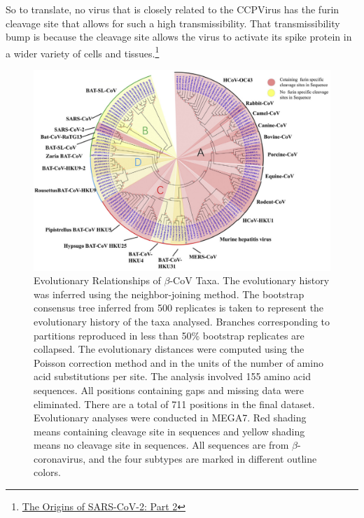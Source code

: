 \documentclass[11pt]{article}
\begin{document}
So to translate, no virus that is closely related to the CCPVirus has the furin cleavage site that allows for such a high transmissibility. That transmissibility bump is because the cleavage site allows the virus to activate its spike protein in a wider variety of cells and tissues.\footnote{\href{https://archive.is/XkCN0}{The Origins of SARS-CoV-2: Part 2}}

\begin{figure}[htbp]
\centering
\includegraphics[width=.9\linewidth]{./images/virus-tree.png}
\caption{Evolutionary Relationships of \(\beta\)-CoV Taxa. The evolutionary history was inferred using the neighbor-joining method. The bootstrap consensus tree inferred from 500 replicates is taken to represent the evolutionary history of the taxa analysed. Branches corresponding to partitions reproduced in less than 50\% bootstrap replicates are collapsed. The evolutionary distances were computed using the Poisson correction method and in the units of the number of amino acid substitutions per site. The analysis involved 155 amino acid sequences. All positions containing gaps and missing data were eliminated. There are a total of 711 positions in the final dataset. Evolutionary analyses were conducted in MEGA7. Red shading means containing cleavage site in sequences and yellow shading means no cleavage site in sequences. All sequences are from \(\beta\)-coronavirus, and the four subtypes are marked in different outline colors.}
\end{figure}
\end{document}
